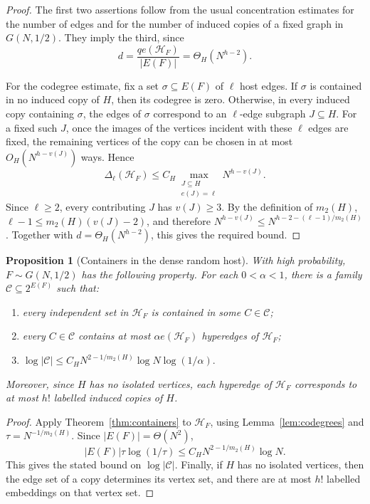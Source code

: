 \documentclass[11pt,reqno]{amsart}
\numberwithin{equation}{section}
\theoremstyle{plain}
\newtheorem{proposition}[theorem]{Proposition}
\theoremstyle{definition}
\newcommand{\calC}{\mathcal C}
\newcommand{\calH}{\mathcal H}
\begin{document}
\begin{proof}
The first two assertions follow from the usual concentration estimates for the
number of edges and for the number of induced copies of a fixed graph in
$G(N,1/2)$.  They imply the third, since
$$
        d=\frac{qe(\calH_F)}{|E(F)|}=\Theta_H(N^{h-2}).
$$

For the codegree estimate, fix a set $\sigma\subseteq E(F)$ of $\ell$ host
edges.  If $\sigma$ is contained in no induced copy of $H$, then its
codegree is zero.  Otherwise, in every induced copy containing $\sigma$, the
edges of $\sigma$ correspond to an $\ell$-edge subgraph $J\subseteq H$.
For a fixed such $J$, once the images of the vertices incident with these
$\ell$ edges are fixed, the remaining vertices of the copy can be chosen in
at most $O_H(N^{h-v(J)})$ ways.  Hence
$$
        \Delta_\ell(\calH_F)
        \le C_H\max_{\substack{J\subseteq H\\ e(J)=\ell}}N^{h-v(J)}.
$$
Since $\ell\ge2$, every contributing $J$ has $v(J)\ge3$.  By the
definition of $m_2(H)$, $\ell-1\le m_2(H)(v(J)-2)$,
and therefore $ N^{h-v(J)}\le N^{h-2-(\ell-1)/m_2(H)}$. Together with $d=\Theta_H(N^{h-2})$, this gives the required bound.
\end{proof}

\begin{proposition}[Containers in the dense random host]
\label{prop:containers}
With high probability, $F\sim G(N,1/2)$ has the following property.  For each
$0<\alpha<1$, there is a family $\calC\subseteq2^{E(F)}$ such that:
\begin{enumerate}[label=\textup{(\arabic*)}]
\item every independent set in $\calH_F$ is contained in some $C\in\calC$;
\item every $C\in\calC$ contains at most $\alpha e(\calH_F)$ hyperedges of
$\calH_F$;
\item
$\log |\calC|
        \le C_HN^{2-1/m_2(H)}\log N\log(1/\alpha).$
\end{enumerate}
Moreover, since $H$ has no isolated vertices, each hyperedge of $\calH_F$
corresponds to at most $h!$ labelled induced copies of $H$.
\end{proposition}

\begin{proof}
Apply Theorem~\ref{thm:containers} to $\calH_F$, using Lemma~\ref{lem:codegrees} and
$\tau=N^{-1/m_2(H)}$.  Since $|E(F)|=\Theta(N^2)$,
$$
        |E(F)|\tau\log(1/\tau)
        \le C_HN^{2-1/m_2(H)}\log N.
$$
This gives the stated bound on $\log|\calC|$.  Finally, if $H$ has no
isolated vertices, then the edge set of a copy determines its vertex set, and
there are at most $h!$ labelled embeddings on that vertex set.
\end{proof}
\end{document}
